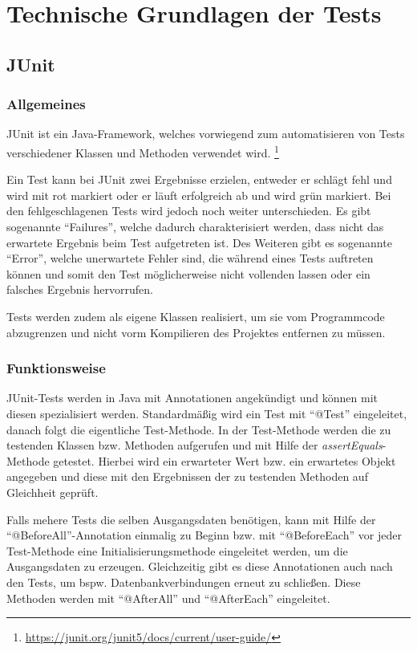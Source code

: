 \section{Technische Grundlagen der Tests}

\subsection{JUnit}

\subsubsection{Allgemeines}

JUnit ist ein Java-Framework, welches vorwiegend zum automatisieren von Tests verschiedener Klassen und Methoden verwendet wird. \footnote{\url{https://junit.org/junit5/docs/current/user-guide/}}

Ein Test kann bei JUnit zwei Ergebnisse erzielen, entweder er schlägt fehl und wird mit rot markiert oder er läuft erfolgreich ab und wird grün markiert.
Bei den fehlgeschlagenen Tests wird jedoch noch weiter unterschieden. 
Es gibt sogenannte \enquote{Failures}, welche dadurch charakterisiert werden, dass nicht das erwartete Ergebnis beim Test aufgetreten ist.
Des Weiteren gibt es sogenannte \enquote{Error}, welche unerwartete Fehler sind, die während eines Tests auftreten können und somit den Test möglicherweise nicht vollenden lassen oder ein falsches Ergebnis hervorrufen.

Tests werden zudem als eigene Klassen realisiert, um sie vom Programmcode abzugrenzen und nicht vorm Kompilieren des Projektes entfernen zu müssen.

\subsubsection{Funktionsweise}

JUnit-Tests werden in Java mit Annotationen angekündigt und können mit diesen spezialisiert werden.
Standardmäßig wird ein Test mit \enquote{@Test} eingeleitet, danach folgt die eigentliche Test-Methode.
In der Test-Methode werden die zu testenden Klassen bzw. Methoden aufgerufen und mit Hilfe der \textit{assertEquals}-Methode getestet.
Hierbei wird ein erwarteter Wert bzw. ein erwartetes Objekt angegeben und diese mit den Ergebnissen der zu testenden Methoden auf Gleichheit geprüft.

Falls mehere Tests die selben Ausgangsdaten benötigen, kann mit Hilfe der \enquote{@BeforeAll}-Annotation einmalig zu Beginn bzw. mit \enquote{@BeforeEach} vor jeder Test-Methode eine Initialisierungsmethode eingeleitet werden, um die Ausgangsdaten zu erzeugen.
Gleichzeitig gibt es diese Annotationen auch nach den Tests, um bspw. Datenbankverbindungen erneut zu schließen. Diese Methoden werden mit \enquote{@AfterAll} und \enquote{@AfterEach} eingeleitet.

